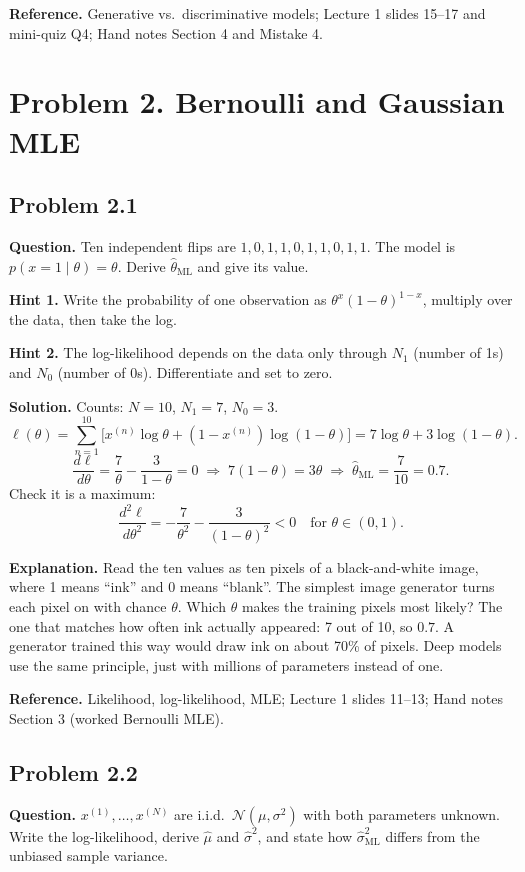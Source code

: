 \documentclass[11pt]{article}
\begin{document}
\textbf{Reference.} Generative vs.\ discriminative models; Lecture 1 slides 15--17 and mini-quiz Q4; Hand notes Section 4 and Mistake 4.

\section*{Problem 2. Bernoulli and Gaussian MLE}

\subsection*{Problem 2.1}
\textbf{Question.} Ten independent flips are $1,0,1,1,0,1,1,0,1,1$. The model is $p(x=1\mid\theta)=\theta$. Derive $\hat\theta_{\text{ML}}$ and give its value.

\textbf{Hint 1.} Write the probability of one observation as $\theta^{x}(1-\theta)^{1-x}$, multiply over the data, then take the log.

\textbf{Hint 2.} The log-likelihood depends on the data only through $N_1$ (number of 1s) and $N_0$ (number of 0s). Differentiate and set to zero.

\textbf{Solution.} Counts: $N=10$, $N_1=7$, $N_0=3$.
\[
\ell(\theta) = \sum_{n=1}^{10}\Big[x^{(n)}\log\theta + (1-x^{(n)})\log(1-\theta)\Big] = 7\log\theta + 3\log(1-\theta).
\]
\[
\frac{d\ell}{d\theta} = \frac{7}{\theta} - \frac{3}{1-\theta} = 0
\;\Rightarrow\; 7(1-\theta) = 3\theta
\;\Rightarrow\; \hat\theta_{\text{ML}} = \frac{7}{10} = 0.7.
\]
Check it is a maximum:
\[
\frac{d^2\ell}{d\theta^2} = -\frac{7}{\theta^2} - \frac{3}{(1-\theta)^2} < 0 \quad\text{for } \theta\in(0,1).
\]

\textbf{Explanation.} Read the ten values as ten pixels of a black-and-white image, where 1 means ``ink'' and 0 means ``blank''. The simplest image generator turns each pixel on with chance $\theta$. Which $\theta$ makes the training pixels most likely? The one that matches how often ink actually appeared: 7 out of 10, so $0.7$. A generator trained this way would draw ink on about 70\% of pixels. Deep models use the same principle, just with millions of parameters instead of one.

\textbf{Reference.} Likelihood, log-likelihood, MLE; Lecture 1 slides 11--13; Hand notes Section 3 (worked Bernoulli MLE).

\subsection*{Problem 2.2}
\textbf{Question.} $x^{(1)},\dots,x^{(N)}$ are i.i.d.\ $\mathcal{N}(\mu,\sigma^2)$ with both parameters unknown. Write the log-likelihood, derive $\hat\mu$ and $\hat\sigma^2$, and state how $\hat\sigma^2_{\text{ML}}$ differs from the unbiased sample variance.
\end{document}
